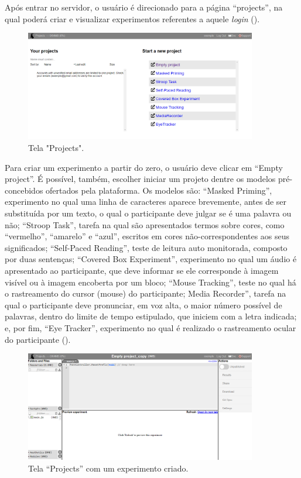 \documentclass{textolivre}
\begin{document}
Após entrar no servidor, o usuário é direcionado para a página “projects”, na qual poderá criar e visualizar experimentos referentes a aquele \emph{login} ().

\begin{figure}[htbp]
 \centering
 \includegraphics[width=0.9\textwidth]{fig-005.png}
 \caption{Tela "Projects".}
 \label{fig5}
\end{figure}

Para criar um experimento a partir do zero, o usuário deve clicar em “Empty project”. É possível, também, escolher iniciar um projeto dentre os modelos pré-concebidos ofertados pela plataforma. Os modelos são: “Masked Priming”, experimento no qual uma linha de caracteres aparece brevemente, antes de ser substituída por um texto, o qual o participante deve julgar se é uma palavra ou não; “Stroop Task”, tarefa na qual são apresentados termos sobre cores, como “vermelho”, “amarelo” e “azul”, escritos em cores não-correspondentes aos seus significados; “Self-Paced Reading”, teste de leitura auto monitorada, composto por duas sentenças; “Covered Box Experiment”, experimento no qual um áudio é apresentado ao participante, que deve informar se ele corresponde à imagem visível ou à imagem encoberta por um bloco; “Mouse Tracking”, teste no qual há o rastreamento do cursor (mouse)  do participante; Media Recorder”, tarefa na qual o participante deve pronunciar, em voz alta, o maior número possível de palavras, dentro do limite de tempo estipulado, que iniciem com a letra indicada; e, por fim, “Eye Tracker”, experimento no qual é realizado o rastreamento ocular do participante ().

\begin{figure}[htbp]
 \centering
 \includegraphics[width=0.9\textwidth]{fig-006.png}
 \caption{Tela “Projects” com um experimento criado.}
 \label{fig6}
\end{figure}
\end{document}
